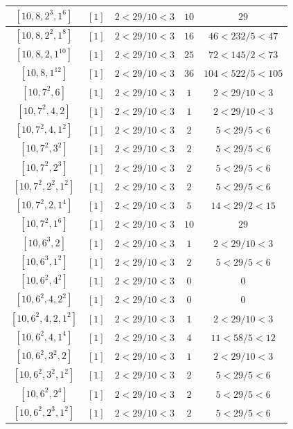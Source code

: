 \documentclass{article}%
\begin{document}
\begin{center}
\begin{longtable}{||c|c|c|c|c||}
$[10, 8, 2^{3}, 1^{6}]$ & $[1]$ & $2 < 29/10 < 3$ & $10$ & $29$ \\ \hline 
$[10, 8, 2^{2}, 1^{8}]$ & $[1]$ & $2 < 29/10 < 3$ & $16$ & $46 < 232/5 < 47$ \\ \hline 
$[10, 8, 2, 1^{10}]$ & $[1]$ & $2 < 29/10 < 3$ & $25$ & $72 < 145/2 < 73$ \\ \hline 
$[10, 8, 1^{12}]$ & $[1]$ & $2 < 29/10 < 3$ & $36$ & $104 < 522/5 < 105$ \\ \hline 
$[10, 7^{2}, 6]$ & $[1]$ & $2 < 29/10 < 3$ & $1$ & $2 < 29/10 < 3$ \\ \hline 
$[10, 7^{2}, 4, 2]$ & $[1]$ & $2 < 29/10 < 3$ & $1$ & $2 < 29/10 < 3$ \\ \hline 
$[10, 7^{2}, 4, 1^{2}]$ & $[1]$ & $2 < 29/10 < 3$ & $2$ & $5 < 29/5 < 6$ \\ \hline 
$[10, 7^{2}, 3^{2}]$ & $[1]$ & $2 < 29/10 < 3$ & $2$ & $5 < 29/5 < 6$ \\ \hline 
$[10, 7^{2}, 2^{3}]$ & $[1]$ & $2 < 29/10 < 3$ & $2$ & $5 < 29/5 < 6$ \\ \hline 
$[10, 7^{2}, 2^{2}, 1^{2}]$ & $[1]$ & $2 < 29/10 < 3$ & $2$ & $5 < 29/5 < 6$ \\ \hline 
$[10, 7^{2}, 2, 1^{4}]$ & $[1]$ & $2 < 29/10 < 3$ & $5$ & $14 < 29/2 < 15$ \\ \hline 
$[10, 7^{2}, 1^{6}]$ & $[1]$ & $2 < 29/10 < 3$ & $10$ & $29$ \\ \hline 
$[10, 6^{3}, 2]$ & $[1]$ & $2 < 29/10 < 3$ & $1$ & $2 < 29/10 < 3$ \\ \hline 
$[10, 6^{3}, 1^{2}]$ & $[1]$ & $2 < 29/10 < 3$ & $2$ & $5 < 29/5 < 6$ \\ \hline 
$[10, 6^{2}, 4^{2}]$ & $[1]$ & $2 < 29/10 < 3$ & $0$ & $0$ \\ \hline 
$[10, 6^{2}, 4, 2^{2}]$ & $[1]$ & $2 < 29/10 < 3$ & $0$ & $0$ \\ \hline 
$[10, 6^{2}, 4, 2, 1^{2}]$ & $[1]$ & $2 < 29/10 < 3$ & $1$ & $2 < 29/10 < 3$ \\ \hline 
$[10, 6^{2}, 4, 1^{4}]$ & $[1]$ & $2 < 29/10 < 3$ & $4$ & $11 < 58/5 < 12$ \\ \hline 
$[10, 6^{2}, 3^{2}, 2]$ & $[1]$ & $2 < 29/10 < 3$ & $1$ & $2 < 29/10 < 3$ \\ \hline 
$[10, 6^{2}, 3^{2}, 1^{2}]$ & $[1]$ & $2 < 29/10 < 3$ & $2$ & $5 < 29/5 < 6$ \\ \hline 
$[10, 6^{2}, 2^{4}]$ & $[1]$ & $2 < 29/10 < 3$ & $2$ & $5 < 29/5 < 6$ \\ \hline 
$[10, 6^{2}, 2^{3}, 1^{2}]$ & $[1]$ & $2 < 29/10 < 3$ & $2$ & $5 < 29/5 < 6$ \\ \hline 

\end{longtable}
\end{center}
\end{document}
